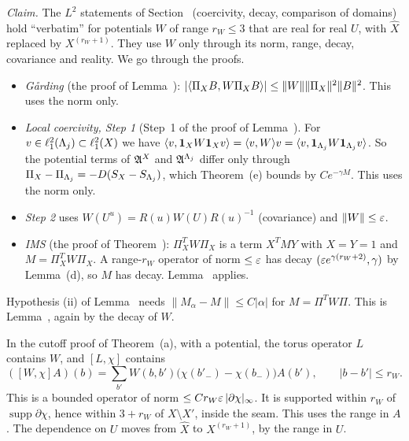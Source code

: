 \begin{detail}\label{d8:range3}
\emph{Claim.} The $L^2$ statements of Section~ (coercivity, decay, comparison of domains) hold ``verbatim'' for potentials $W$ of range $r_W\le3$ that are real for real $U$, with $\hat X$ replaced by $X^{(r_W+1)}$. They use $W$ only through its norm, range, decay, covariance and reality. We go through the proofs.
\begin{step}[Coercivity]
\begin{itemize}
\item \emph{G\aa rding} (the proof of Lemma~): $|\langle \Pi_XB,W\Pi_XB\rangle|\le\|W\|\|\Pi_X\|^2\|B\|^2$. This uses the norm only.
\item \emph{Local coercivity, Step 1} (Step~1 of the proof of Lemma~). For $v\in\ell^2_1(\Lambda_j)\subset\ell^2_1(X)$ we have $\langle v,\mathbf 1_XW\mathbf 1_Xv\rangle=\langle v,W\rangle v=\langle v,\mathbf 1_{\Lambda_j}W\mathbf 1_{\Lambda_j}v\rangle$. So the potential terms of $\mathfrak A^X$ and $\mathfrak A^{\Lambda_j}$ differ only through $\Pi_X-\Pi_{\Lambda_j}=-D(S_X-S_{\Lambda_j})$, which Theorem~(e) bounds by $Ce^{-\gamma M}$. This uses the norm only.
\item \emph{Step 2} uses $W(U^u)=R(u)W(U)R(u)^{-1}$ (covariance) and $\|W\|\le\varepsilon$.
\item \emph{IMS} (the proof of Theorem~): $\Pi_X^TW\Pi_X$ is a term $X^TMY$ with $X=Y=1$ and $M=\Pi_X^TW\Pi_X$. A range-$r_W$ operator of norm $\le\varepsilon$ has decay $(\varepsilon e^{\gamma(r_W+2)},\gamma)$ by Lemma~(d), so $M$ has decay. Lemma~ applies.
\end{itemize}
\end{step}
\begin{step}[Decay]
Hypothesis (ii) of Lemma~ needs $\|M_\alpha-M\|\le C|\alpha|$ for $M=\Pi^TW\Pi$. This is Lemma~, again by the decay of $W$.
\end{step}
\begin{step}
In the cutoff proof of Theorem~(a), with a potential, the torus operator $L$ contains $W$, and $[L,\chi]$ contains
\[
([W,\chi]A)(b)=\textstyle\sum_{b'}W(b,b')\big(\chi(b'_-)-\chi(b_-)\big)A(b'),\qquad|b-b'|\le r_W .
\]
This is a bounded operator of norm $\le C r_W\varepsilon\,|\partial\chi|_\infty$. It is supported within $r_W$ of $\operatorname{supp}\partial\chi$, hence within $3+r_W$ of $X\setminus X'$, inside the seam. This uses the range in $A$. The dependence on $U$ moves from $\hat X$ to $X^{(r_W+1)}$, by the range in $U$.

\end{step}
\end{detail}
